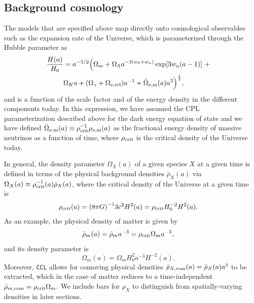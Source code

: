 \documentclass[\docopts]{\docclass}
\newcommand{\ccl}{{\tt CCL}\xspace}
\begin{document}


\subsection{Background cosmology}

The models that are specified above map directly onto cosmological observables such as the expansion rate of the Universe, which is parameterized through the Hubble parameter as
\begin{align}\label{eq:Ha}
\frac{H(a)}{H_0} &= a^{-3/2}\Big(\Omega_{m}+\Omega_{\Lambda} a^{-3(w_0+w_a)}
\exp[3 w_a (a-1)]~+ \nonumber \\ &\Omega_{K} a + (\Omega_{\gamma} + \Omega_{\nu, {\rm rel}}) a^{-1} + \tilde\Omega_{\nu, {\rm m}}(a)a^3\Big)^{\frac{1}{2}} ,
\end{align}
and is a function of the scale factor and of the energy density in the different components today. In this expression, we have assumed the CPL parameterization described above for the dark energy equation of state and we have defined $\tilde\Omega_{\nu, {\rm m}}(a) \equiv \rho^{-1}_{\rm crit} \rho_{\nu, {\rm m}}(a)$ as the fractional energy density of massive neutrinos as a function of time, where $\rho_{\rm crit}$ is the critical density of the Universe today.

In general, the density parameter $\Omega_X(a)$ of a given species $X$ at a given time is defined in terms of the physical background densities $\bar\rho_X(a)$ via $\Omega_X(a) \equiv \rho^{-1}_{\rm crit}(a) \bar\rho_X(a)$, where the critical density of the Universe at a given time is
\begin{equation}
  \rho_{\rm crit}(a) = {( 8 \pi G)}^{-1} 3c^2H^2(a) = \rho_{\rm crit} H_0^{-2} H^2(a).
  \label{eq:rhocrit}
\end{equation}
As an example, the physical density of matter is given by
\begin{equation}
  \bar\rho_m(a) = \bar\rho_{m} a^{-3} = \rho_{\rm crit} \Omega_{m} a^{-3},
\end{equation}
and its density parameter is
\begin{equation}
  \Omega_m(a) = \Omega_{m} H_0^{2} a^{-3} H^{-2}(a).
\end{equation}
Moreover, \ccl allows for comoving physical densities $\bar\rho_{X, {\rm com}}(a) = \bar\rho_X(a) a^3$ to be extracted, which in the case of matter reduces to a time-independent $\bar\rho_{m, {\rm com}} = \rho_{\rm crit} \Omega_{m}$. We include bars for $\rho_X$ to distinguish from spatially-varying densities in later sections.
\end{document}
